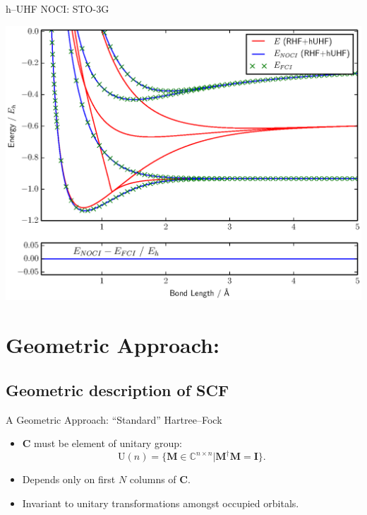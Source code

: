 \documentclass{beamer}
\begin{document}
\begin{frame}{h--UHF NOCI:  STO-3G}
 \vspace{-1em}
 \begin{center}
  \includegraphics[scale=0.4]{20161219_ThomGroup_Update/H2_STO-3G}
 \end{center}
\end{frame} 

\section{Geometric Approach:}
\subsection{Geometric description of SCF}
\begin{frame}{A Geometric Approach: ``Standard'' Hartree--Fock}
\begin{itemize}
  \item<1-> $\mathbf{C}$ must be element of unitary group:
  $$\mathrm{U} \left( n \right) = \{ \mathbf{M} \in \mathbb{C}^{n \times n} | \mathbf{M}^{\dagger} \mathbf{M} = \mathbf{I} \}.$$
\end{itemize}
\vspace{-1em}
\begin{itemize}
  \item<2-> Depends only on first $N$ columns of $\mathbf{C}.$
  \item<2-> Invariant to unitary transformations amongst occupied orbitals.
\end{itemize}
\end{frame}
\end{document}
